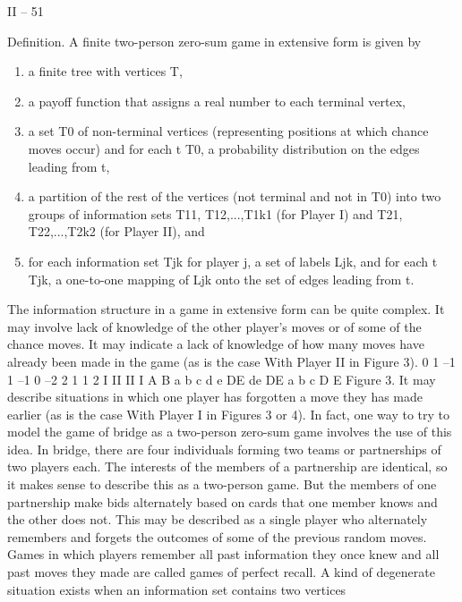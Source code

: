 \begin{framed}
II – 51
\begin{framed}
Definition. A finite two-person zero-sum game in extensive form is given by
\begin{enumerate}
\item a finite tree with vertices T,
\item a payoff function that assigns a real number to each terminal vertex,
\item a set T0 of non-terminal vertices (representing positions at which chance moves
occur) and for each t \in T0, a probability distribution on the edges leading from t,
\item a partition of the rest of the vertices (not terminal and not in T0) into two groups
of information sets T11, T12,...,T1k1 (for Player I) and T21, T22,...,T2k2 (for Player II),
and
\item for each information set Tjk for player j, a set of labels Ljk, and for each t \in Tjk,
a one-to-one mapping of Ljk onto the set of edges leading from t.
\end{enumerate}
\end{framed}
The information structure in a game in extensive form can be quite complex. It may
involve lack of knowledge of the other player’s moves or of some of the chance moves. It
may indicate a lack of knowledge of how many moves have already been made in the game
(as is the case With Player II in Figure 3).
0
1 –1 1 –1 0 –2 2 1
1 2
I
II II
I
A B
a b c d
e
DE de DE a b c
D E
Figure 3.
It may describe situations in which one player has forgotten a move they has made
earlier (as is the case With Player I in Figures 3 or 4). In fact, one way to try to model
the game of bridge as a two-person zero-sum game involves the use of this idea. In bridge,
there are four individuals forming two teams or partnerships of two players each. The
interests of the members of a partnership are identical, so it makes sense to describe this
as a two-person game. But the members of one partnership make bids alternately based
on cards that one member knows and the other does not. This may be described as a
single player who alternately remembers and forgets the outcomes of some of the previous
random moves. Games in which players remember all past information they once knew
and all past moves they made are called games of perfect recall.
A kind of degenerate situation exists when an information set contains two vertices

\end{framed}
